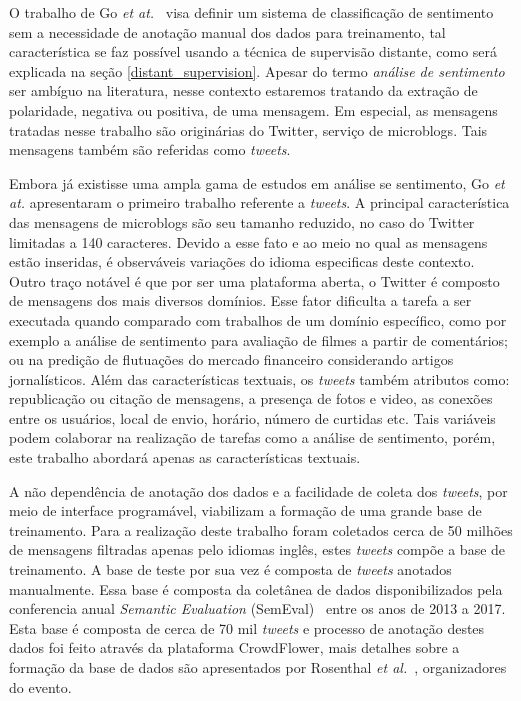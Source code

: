 O trabalho de Go \textit{et at.}~\cite{go09} visa definir um sistema de classificação de sentimento sem a necessidade
de anotação manual dos dados para treinamento, tal característica se faz possível usando a técnica de supervisão
distante, como será explicada na seção \ref{distant_supervision}.
Apesar do termo \textit{análise de sentimento} ser ambíguo na literatura, nesse contexto estaremos tratando da extração
de polaridade, negativa ou positiva, de uma mensagem.
Em especial, as mensagens tratadas nesse trabalho são originárias do Twitter, serviço de microblogs.
Tais mensagens também são referidas como \textit{tweets}.

Embora já existisse uma ampla gama de estudos em análise se sentimento, Go \textit{et at.} apresentaram o primeiro
trabalho referente a \textit{tweets}.
A principal característica das mensagens de microblogs são seu tamanho reduzido, no caso do Twitter limitadas a
140 caracteres.
Devido a esse fato e ao meio no qual as mensagens estão inseridas, é observáveis variações do idioma especificas
deste contexto.
Outro traço notável é que por ser uma plataforma aberta, o Twitter é composto de mensagens dos mais diversos domínios.
Esse fator dificulta a tarefa a ser executada quando comparado com trabalhos de um domínio específico, como por exemplo
a análise de sentimento para avaliação de filmes a partir de comentários; ou na predição de flutuações do mercado
financeiro considerando artigos jornalísticos.
Além das características textuais, os \textit{tweets} também atributos como: republicação ou citação de mensagens, a
presença de fotos e video, as conexões entre os usuários, local de envio, horário, número de curtidas etc. Tais variáveis
podem colaborar na realização de tarefas como a análise de sentimento, porém, este trabalho abordará apenas as
características textuais.

A não dependência de anotação dos dados e a facilidade de coleta dos \textit{tweets}, por meio de interface programável,
viabilizam a formação de uma grande base de treinamento.
Para a realização deste trabalho foram coletados cerca de 50 milhões de mensagens filtradas apenas pelo idiomas inglês,
estes \textit{tweets} compõe a base de treinamento.
A base de teste por sua vez é composta de \textit{tweets} anotados manualmente. Essa base é composta da coletânea de dados
disponibilizados pela conferencia anual \textit{Semantic Evaluation} (SemEval)~\cite{semeval17} entre os anos de 2013 a 2017.
Esta base é composta de cerca de 70 mil \textit{tweets} e processo de anotação destes dados foi feito através da plataforma
CrowdFlower, mais detalhes sobre a formação da base de dados são apresentados por Rosenthal \textit{et al.}~\cite{rosenthal17},
organizadores do evento.

